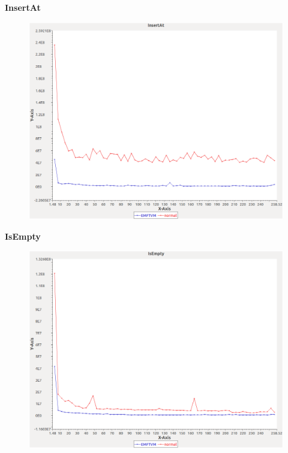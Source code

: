 \noindent\textbf{InsertAt}

\begin{figure}[h]
\centering
\includegraphics[width=\textwidth]{graphs/sequence/InsertAt}
\end{figure}
\pagebreak

\noindent\textbf{IsEmpty}

\begin{figure}[h]
\centering
\includegraphics[width=\textwidth]{graphs/sequence/IsEmpty}
\end{figure}
\pagebreak

